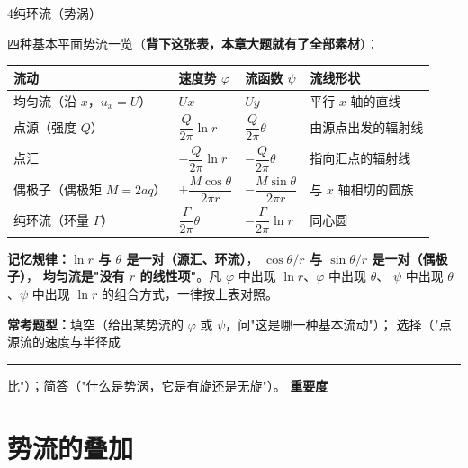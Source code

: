 \begin{kaodian}{4}{纯环流（势涡）}
\begin{jielun}
四种基本平面势流一览（\textbf{背下这张表，本章大题就有了全部素材}）：
\begin{center}
\begin{tabularx}{\textwidth}{@{}lXXl@{}}
\toprule
流动 & 速度势 $\varphi$ & 流函数 $\psi$ & 流线形状 \\
\midrule
均匀流（沿 $x$，$u_x=U$） & $Ux$ & $Uy$ & 平行 $x$ 轴的直线 \\
点源（强度 $Q$） & $\dfrac{Q}{2\pi}\ln r$ & $\dfrac{Q}{2\pi}\theta$ & 由源点出发的辐射线 \\
点汇 & $-\dfrac{Q}{2\pi}\ln r$ & $-\dfrac{Q}{2\pi}\theta$ & 指向汇点的辐射线 \\
偶极子（偶极矩 $M=2aq$） & $+\dfrac{M\cos\theta}{2\pi r}$ & $-\dfrac{M\sin\theta}{2\pi r}$ & 与 $x$ 轴相切的圆族 \\
纯环流（环量 $\Gamma$） & $\dfrac{\Gamma}{2\pi}\theta$ & $-\dfrac{\Gamma}{2\pi}\ln r$ & 同心圆 \\
\bottomrule
\end{tabularx}
\end{center}
\textbf{记忆规律：}\textbf{$\ln r$ 与 $\theta$ 是一对（源汇、环流）}，
\textbf{$\cos\theta/r$ 与 $\sin\theta/r$ 是一对（偶极子）}，
\textbf{均匀流是"没有 $r$ 的线性项"}。凡 $\varphi$ 中出现 $\ln r$、$\varphi$ 中出现 $\theta$、
$\psi$ 中出现 $\theta$、$\psi$ 中出现 $\ln r$ 的组合方式，一律按上表对照。
\end{jielun}

\textbf{常考题型：}填空（给出某势流的 $\varphi$ 或 $\psi$，问"这是哪一种基本流动"）；
选择（"点源流的速度与半径成\rule{1.2cm}{0.4pt}比"）；简答（"什么是势涡，它是有旋还是无旋"）。
\textbf{重要度 }\quad{}\quad{}
\end{kaodian}

\section{势流的叠加}

